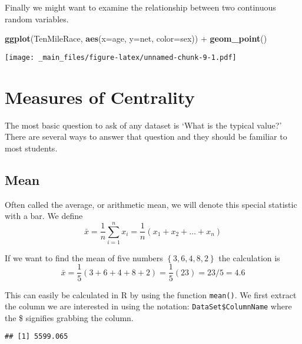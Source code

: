 \documentclass[]{book}
\newenvironment{Shaded}{\begin{snugshade}}{\end{snugshade}}
\newcommand{\KeywordTok}[1]{\textcolor[rgb]{0.13,0.29,0.53}{\textbf{{#1}}}}
\newcommand{\DataTypeTok}[1]{\textcolor[rgb]{0.13,0.29,0.53}{{#1}}}
\newcommand{\StringTok}[1]{\textcolor[rgb]{0.31,0.60,0.02}{{#1}}}
\newcommand{\CommentTok}[1]{\textcolor[rgb]{0.56,0.35,0.01}{\textit{{#1}}}}
\newcommand{\NormalTok}[1]{{#1}}
\begin{document}
Finally we might want to examine the relationship between two continuous
random variables.

\begin{Shaded}
\begin{Highlighting}[]
\KeywordTok{ggplot}\NormalTok{(TenMileRace, }\KeywordTok{aes}\NormalTok{(}\DataTypeTok{x=}\NormalTok{age, }\DataTypeTok{y=}\NormalTok{net, }\DataTypeTok{color=}\NormalTok{sex)) +}
\StringTok{  }\KeywordTok{geom_point}\NormalTok{()}
\end{Highlighting}
\end{Shaded}

\texttt{[image: \_main\_files/figure-latex/unnamed-chunk-9-1.pdf]}

\section{Measures of Centrality}\label{measures-of-centrality}

The most basic question to ask of any dataset is `What is the typical
value?' There are several ways to answer that question and they should
be familiar to most students.

\subsection{Mean}\label{mean}

Often called the average, or arithmetic mean, we will denote this
special statistic with a bar. We define
\[\bar{x}=\frac{1}{n}\sum_{i=1}^{n}x_{i}=\frac{1}{n}\left(x_{1}+x_{2}+\dots+x_{n}\right)\]

If we want to find the mean of five numbers
\(\left\{ 3,6,4,8,2\right\}\) the calculation is
\[\bar{x}   =   \frac{1}{5}\left(3+6+4+8+2\right)
    =   \frac{1}{5}\left(23\right)
    =   23/5
    =   4.6\]

This can easily be calculated in R by using the function
\texttt{mean()}. We first extract the column we are interested in using
the notation: \texttt{DataSet\$ColumnName} where the \$ signifies
grabbing the column.

\begin{Shaded}
\end{Shaded}

\begin{verbatim}
## [1] 5599.065
\end{verbatim}
\end{document}
